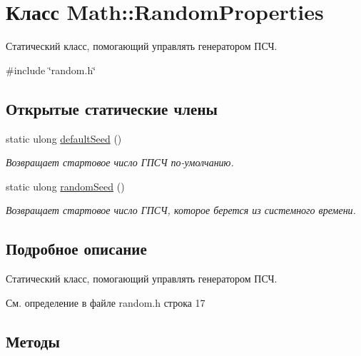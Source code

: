 \hypertarget{class_math_1_1_random_properties}{}\section{Класс Math\+:\+:Random\+Properties}
\label{class_math_1_1_random_properties}


Статический класс, помогающий управлять генератором ПСЧ.  




{\ttfamily \#include \char`\"{}random.\+h\char`\"{}}

\subsection*{Открытые статические члены}
\begin{DoxyCompactItemize}
\item 
static ulong \hyperlink{class_math_1_1_random_properties_a8c37bfae29a4b0d5c012532445dd5d6f}{default\+Seed} ()
\begin{DoxyCompactList}\small\item\em Возвращает стартовое число ГПСЧ по-\/умолчанию. \end{DoxyCompactList}\item 
static ulong \hyperlink{class_math_1_1_random_properties_a94bd24abcba2d281ea50dce34a0a9ac4}{random\+Seed} ()
\begin{DoxyCompactList}\small\item\em Возвращает стартовое число ГПСЧ, которое берется из системного времени. \end{DoxyCompactList}\end{DoxyCompactItemize}


\subsection{Подробное описание}
Статический класс, помогающий управлять генератором ПСЧ. 

См. определение в файле random.\+h строка 17



\subsection{Методы}
